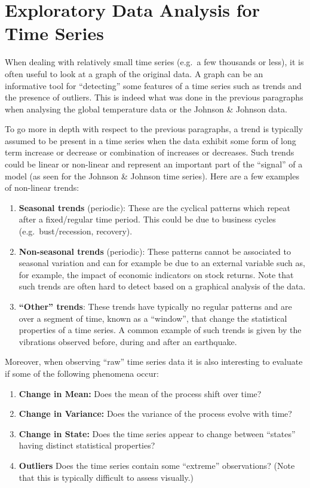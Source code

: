 \documentclass[]{book}
\providecommand{\tightlist}{%
  \setlength{\itemsep}{0pt}\setlength{\parskip}{0pt}}
\theoremstyle{definition}
\theoremstyle{definition}
\theoremstyle{definition}
\theoremstyle{remark}
\begin{document}
\hypertarget{eda}{%
\section{Exploratory Data Analysis for Time Series}\label{eda}}

When dealing with relatively small time series (e.g.~a few thousands or
less), it is often useful to look at a graph of the original data. A
graph can be an informative tool for ``detecting'' some features of a
time series such as trends and the presence of outliers. This is indeed
what was done in the previous paragraphs when analysing the global
temperature data or the Johnson \& Johnson data.

To go more in depth with respect to the previous paragraphs, a trend is
typically assumed to be present in a time series when the data exhibit
some form of long term increase or decrease or combination of increases
or decreases. Such trends could be linear or non-linear and represent an
important part of the ``signal'' of a model (as seen for the Johnson \&
Johnson time series). Here are a few examples of non-linear trends:

\begin{enumerate}
\def\labelenumi{\arabic{enumi}.}
\item
  \textbf{Seasonal trends} (periodic): These are the cyclical patterns
  which repeat after a fixed/regular time period. This could be due to
  business cycles (e.g.~bust/recession, recovery).
\item
  \textbf{Non-seasonal trends} (periodic): These patterns cannot be
  associated to seasonal variation and can for example be due to an
  external variable such as, for example, the impact of economic
  indicators on stock returns. Note that such trends are often hard to
  detect based on a graphical analysis of the data.
\item
  \textbf{``Other'' trends}: These trends have typically no regular
  patterns and are over a segment of time, known as a ``window'', that
  change the statistical properties of a time series. A common example
  of such trends is given by the vibrations observed before, during and
  after an earthquake.
\end{enumerate}

Moreover, when observing ``raw'' time series data it is also interesting
to evaluate if some of the following phenomena occur:

\begin{enumerate}
\def\labelenumi{\arabic{enumi}.}
\tightlist
\item
  \textbf{Change in Mean:} Does the mean of the process shift over time?
\item
  \textbf{Change in Variance:} Does the variance of the process evolve
  with time?
\item
  \textbf{Change in State:} Does the time series appear to change
  between ``states'' having distinct statistical properties?
\item
  \textbf{Outliers} Does the time series contain some ``extreme''
  observations? (Note that this is typically difficult to assess
  visually.)
\end{enumerate}
\end{document}
